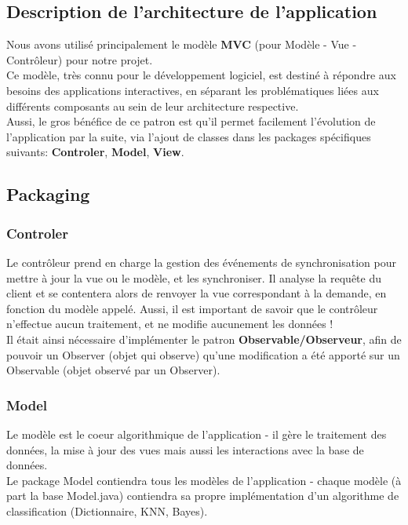 \documentclass[pdftex,12pt,a4paper]{report}
\begin{document}
\begin{spacing}{1.2}
\section{Description de l'architecture de l'application}

Nous avons utilisé principalement le modèle \textbf{MVC} (pour Modèle - Vue - Contrôleur) pour notre projet.\\
Ce modèle, très connu pour le développement logiciel, est destiné à répondre aux besoins des applications interactives, en séparant les problématiques liées aux différents composants au sein de leur architecture respective.\\
Aussi, le gros bénéfice de ce patron est qu'il permet facilement l'évolution de l'application par la suite, via l'ajout de classes dans les packages spécifiques suivants: \textbf{Controler}, \textbf{Model}, \textbf{View}.

\subsection{Packaging}

\subsubsection{Controler}

Le contrôleur prend en charge la gestion des événements de synchronisation pour mettre à jour la vue ou le modèle, et les synchroniser. Il analyse la requête du client et se contentera alors de renvoyer la vue correspondant à la demande, en fonction du modèle appelé. Aussi, il est important de savoir que le contrôleur n'effectue aucun traitement, et ne modifie aucunement les données !
\\
Il était ainsi nécessaire d'implémenter le patron \textbf{Observable/Observeur}, afin de pouvoir un Observer (objet qui observe) qu'une modification a été apporté sur un Observable (objet observé par un Observer).

\subsubsection{Model}

Le modèle est le coeur algorithmique de l'application - il gère le traitement des données, la mise à jour des vues mais aussi les interactions avec la base de données.
\\
Le package Model contiendra tous les modèles de l'application - chaque modèle (à part la base Model.java) contiendra sa propre implémentation d'un algorithme de classification (Dictionnaire, KNN, Bayes).


\end{spacing}
\end{document}
